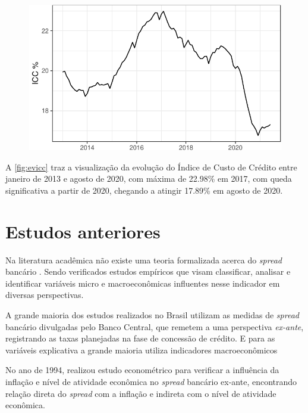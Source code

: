 \documentclass[12pt,openright,oneside,a4paper,chapter=TITLE,section=TITLE,subsection=Title,english,french,spanish,portugues,sumario=tradicional]{04-class-files/abntex2}
\begin{document}
\begin{figure}

\begin{center}\includegraphics{12-exportedfigures/ICC-1} \end{center}
\label{fig:evicc}
\end{figure}

A \autoref{fig:evicc} traz a visualização da evolução do Índice de Custo de
Crédito entre janeiro de 2013 e agosto de 2020, com máxima de 22.98\% em
2017, com queda significativa a partir de 2020, chegando a atingir 17.89\%
em agosto de 2020.

\section{Estudos anteriores}

Na literatura acadêmica não existe uma teoria formalizada acerca do \emph{spread}
bancário \cite{timotio:2018}. Sendo verificados estudos empíricos que visam
classificar, analisar e identificar variáveis micro e macroeconômicas
influentes nesse indicador em diversas perspectivas.

A grande maioria dos estudos realizados no Brasil utilizam as medidas de
\emph{spread} bancário divulgadas pelo Banco Central, que remetem a uma perspectiva
\emph{ex-ante}, registrando as taxas planejadas na fase de concessão de crédito. E
para as variáveis explicativa a grande maioria utiliza indicadores
macroeconômicos \cite{dantas:2012}

No ano de 1994, \textcite{aronovich:1994} realizou estudo econométrico para
verificar a influência da inflação e nível de atividade econômica no \emph{spread}
bancário ex-ante, encontrando relação direta do \emph{spread} com a inflação e
indireta com o nível de atividade econômica.
\end{document}
